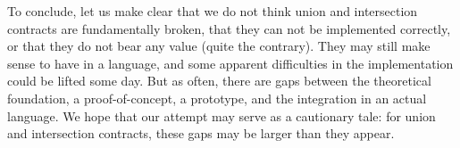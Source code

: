 \documentclass[sigplan,screen,10pt]{acmart}
\begin{document}
To conclude, let us make clear that we do not think union and intersection
contracts are fundamentally broken, that they can not be implemented correctly,
or that they do not bear any value (quite the contrary). They may still make
sense to have in a language, and some apparent difficulties in the
implementation could be lifted some day. But as often, there are gaps between
the theoretical foundation, a proof-of-concept, a prototype, and the integration
in an actual language. We hope that our attempt may serve as a cautionary tale:
for union and intersection contracts, these gaps may be larger than
they appear.


\end{document}
